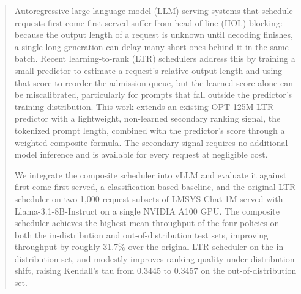 \begin{abstract}
Autoregressive large language model (LLM) serving systems that schedule requests
first-come-first-served suffer from head-of-line (HOL) blocking: because the
output length of a request is unknown until decoding finishes, a single long
generation can delay many short ones behind it in the same batch. Recent
learning-to-rank (LTR) schedulers address this by training a small predictor to
estimate a request's relative output length and using that score to reorder
the admission queue, but the learned score alone can be miscalibrated,
particularly for prompts that fall outside the predictor's training
distribution. This work extends an existing OPT-125M LTR predictor with a
lightweight, non-learned secondary ranking signal, the tokenized prompt length,
combined with the predictor's score through a weighted composite formula. The
secondary signal requires no additional model inference and is available for
every request at negligible cost.

We integrate the composite scheduler into vLLM and evaluate it against
first-come-first-served, a classification-based baseline, and the original
LTR scheduler on two 1{,}000-request subsets of LMSYS-Chat-1M served with
Llama-3.1-8B-Instruct on a single NVIDIA A100 GPU. The composite scheduler
achieves the highest mean throughput of the four policies on both the
in-distribution and out-of-distribution test sets, improving throughput by
roughly 31.7\% over the original LTR scheduler on the in-distribution set, and
modestly improves ranking quality under distribution shift, raising Kendall's
tau from 0.3445 to 0.3457 on the out-of-distribution set.
\end{abstract}
